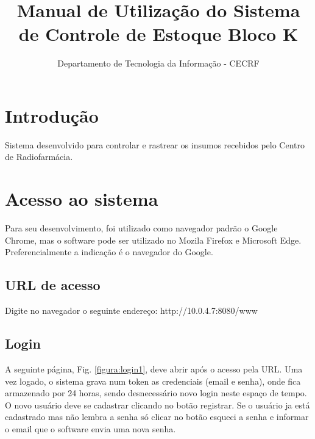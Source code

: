 \documentclass[letterpaper, 12 pt]{article}
\begin{document}
\title{Manual de Utilização do Sistema de Controle de Estoque Bloco K}
\author{Departamento de Tecnologia da Informação - CECRF}
\maketitle
\pagestyle{empty}
\newpage


\tableofcontents
\newpage

\section{Introdução}
Sistema desenvolvido para controlar e rastrear os insumos recebidos pelo Centro de Radiofarmácia.
\newpage


\section{Acesso ao sistema}
Para seu desenvolvimento, foi utilizado como navegador padrão o Google Chrome, mas o software pode ser utilizado 
no Mozila Firefox e Microsoft Edge. Preferencialmente a indicação é o navegador do Google.
\subsection{URL de acesso}
Digite no navegador o seguinte endereço: http://10.0.4.7:8080/www
\subsection{Login}
A seguinte página, Fig. \ref{figura:login1}, deve abrir após o acesso pela URL. Uma vez logado, o sistema grava num token as credenciais (email e senha), onde fica armazenado por 24 horas, sendo desnecessário novo login neste espaço de tempo.
O novo usuário deve se cadastrar clicando no botão registrar. Se o usuário ja está cadastrado mas não lembra a senha só clicar no botão esqueci a senha e informar o email que o software envia uma nova senha.
\end{document}
